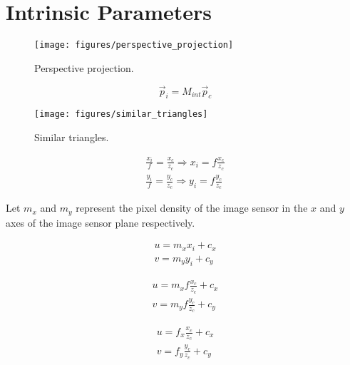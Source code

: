 \section{Intrinsic Parameters}

\begin{figure}[h!]
    \centering
    \texttt{[image: figures/perspective\_projection]}
    \caption{Perspective projection.}
\end{figure}

\begin{equation}
    \vec{p}_i = M_{int} \vec{p}_c
\end{equation}

\begin{figure}[h!]
    \centering
    \texttt{[image: figures/similar\_triangles]}
    \caption{Similar triangles.}
\end{figure}

\begin{gather}
    \frac{x_i}{f} = \frac{x_c}{z_c} \Rightarrow x_i = f \frac{x_c}{z_c} \\
    \frac{y_i}{f} = \frac{y_c}{z_c} \Rightarrow y_i = f \frac{y_c}{z_c}
\end{gather}


Let $m_x$ and $m_y$ represent the pixel density of the image sensor in the $x$ and $y$ axes of the image sensor plane respectively.


\begin{gather}
    u = m_x x_i + c_x \\
    v = m_y y_i + c_y
\end{gather}

\begin{gather}
    u = m_x f \frac{x_c}{z_c} + c_x \\
    v = m_y f \frac{y_c}{z_c} + c_y
\end{gather}

\begin{gather}
    u = f_x \frac{x_c}{z_c} + c_x \\
    v = f_y \frac{y_c}{z_c} + c_y
\end{gather}

